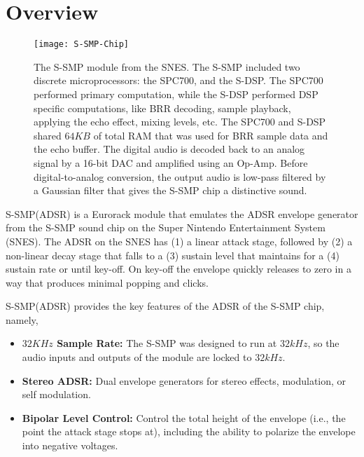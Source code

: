 \documentclass[12pt,letter]{article}
\begin{document}


\section*{Overview}

\begin{figure}[!htp]
\centering
\texttt{[image: S-SMP-Chip]}
\caption{The S-SMP module from the SNES. The S-SMP included two discrete microprocessors: the SPC700, and the S-DSP. The SPC700 performed primary computation, while the S-DSP performed DSP specific computations, like BRR decoding, sample playback, applying the echo effect, mixing levels, etc. The SPC700 and S-DSP shared $64KB$ of total RAM that was used for BRR sample data and the echo buffer. The digital audio is decoded back to an analog signal by a 16-bit DAC and amplified using an Op-Amp. Before digital-to-analog conversion, the output audio is low-pass filtered by a Gaussian filter that gives the S-SMP chip a distinctive sound.}
\end{figure}

\clearpage

S-SMP(ADSR) is a Eurorack module that emulates the ADSR envelope generator from the S-SMP sound chip on the Super Nintendo Entertainment System (SNES). The ADSR on the SNES has (1) a linear attack stage, followed by (2) a non-linear decay stage that falls to a (3) sustain level that maintains for a (4) sustain rate or until key-off. On key-off the envelope quickly releases to zero in a way that produces minimal popping and clicks.

S-SMP(ADSR) provides the key features of the ADSR of the S-SMP chip,
namely,
\begin{itemize}
  \item \textbf{$32KHz$ Sample Rate:} The S-SMP was designed to run at $32kHz$, so the audio inputs and outputs of the module are locked to $32kHz$.
  \item \textbf{Stereo ADSR:} Dual envelope generators for stereo effects, modulation, or self modulation.
  \item \textbf{Bipolar Level Control:} Control the total height of the envelope (i.e., the point the attack stage stops at), including the ability to polarize the envelope into negative voltages.
\end{itemize}
\end{document}
